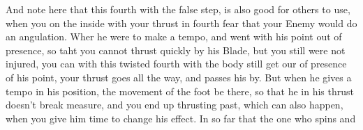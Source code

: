And note here that this fourth with the false step, is also good for
others to use, when you on the inside with your thrust in fourth fear
that your Enemy would do an angulation. Wher he were to make a tempo,
and went with his point out of presence, so taht you cannot thrust
quickly by his Blade, but you still were not injured,
you can with this twisted fourth with the body still get our of
presence of his point, your thrust goes all the way, and passes his
by. But when he gives a tempo in his position, the movement of the
foot be there, so that he in his thrust doesn't break measure, and you
end up thrusting past, which can also happen, when you give him time
to change his effect. In so far that the one who spins and
